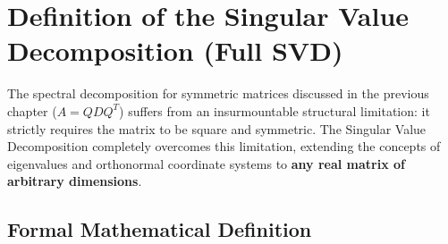 \FloatBarrier
\section{Definition of the Singular Value Decomposition (Full SVD)}
\label{sec:svd-definition-full-en}

The spectral decomposition for symmetric matrices discussed in the previous chapter ($A = QDQ^T$) suffers from an insurmountable structural limitation: it strictly requires the matrix to be square and symmetric. The Singular Value Decomposition completely overcomes this limitation, extending the concepts of eigenvalues and orthonormal coordinate systems to \textbf{any real matrix of arbitrary dimensions}.

\subsection{Formal Mathematical Definition}

